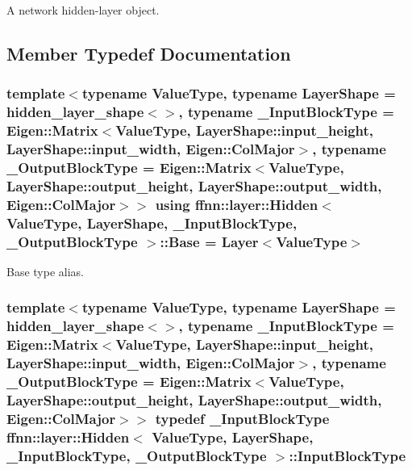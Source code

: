 A network hidden-\/layer object. 

\subsection{Member Typedef Documentation}
\hypertarget{classffnn_1_1layer_1_1_hidden_a2ff8a0b925b2b929b05e7889dda361e4}{
\subsubsection[{Base}]{\setlength{\rightskip}{0pt plus 5cm}template$<$typename Value\-Type, typename Layer\-Shape = hidden\-\_\-layer\-\_\-shape$<$$>$, typename \-\_\-\-Input\-Block\-Type = Eigen\-::\-Matrix$<$\-Value\-Type, Layer\-Shape\-::input\-\_\-height,  Layer\-Shape\-::input\-\_\-width,  Eigen\-::\-Col\-Major$>$, typename \-\_\-\-Output\-Block\-Type = Eigen\-::\-Matrix$<$\-Value\-Type, Layer\-Shape\-::output\-\_\-height, Layer\-Shape\-::output\-\_\-width, Eigen\-::\-Col\-Major$>$$>$ using {\bf ffnn\-::layer\-::\-Hidden}$<$ Value\-Type, Layer\-Shape, \-\_\-\-Input\-Block\-Type, \-\_\-\-Output\-Block\-Type $>$\-::{\bf Base} =  {\bf Layer}$<$Value\-Type$>$}}\label{classffnn_1_1layer_1_1_hidden_a2ff8a0b925b2b929b05e7889dda361e4}


Base type alias. 

\hypertarget{classffnn_1_1layer_1_1_hidden_ae401b1af7763caf09a0dffcaf4f2d5e9}{
\subsubsection[{Input\-Block\-Type}]{\setlength{\rightskip}{0pt plus 5cm}template$<$typename Value\-Type, typename Layer\-Shape = hidden\-\_\-layer\-\_\-shape$<$$>$, typename \-\_\-\-Input\-Block\-Type = Eigen\-::\-Matrix$<$\-Value\-Type, Layer\-Shape\-::input\-\_\-height,  Layer\-Shape\-::input\-\_\-width,  Eigen\-::\-Col\-Major$>$, typename \-\_\-\-Output\-Block\-Type = Eigen\-::\-Matrix$<$\-Value\-Type, Layer\-Shape\-::output\-\_\-height, Layer\-Shape\-::output\-\_\-width, Eigen\-::\-Col\-Major$>$$>$ typedef \-\_\-\-Input\-Block\-Type {\bf ffnn\-::layer\-::\-Hidden}$<$ Value\-Type, Layer\-Shape, \-\_\-\-Input\-Block\-Type, \-\_\-\-Output\-Block\-Type $>$\-::{\bf Input\-Block\-Type}}}\label{classffnn_1_1layer_1_1_hidden_ae401b1af7763caf09a0dffcaf4f2d5e9}


